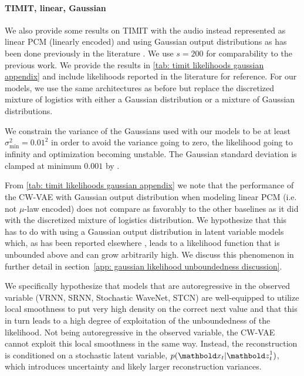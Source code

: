 {\paragraph{TIMIT, linear, Gaussian} We also provide some results on TIMIT with the audio instead represented as linear PCM (linearly encoded) and using Gaussian output distributions as has been done previously in the literature \cite{chung_recurrent_2015, fraccaro_sequential_2016, lai_stochastic_2018, aksan_stcn_2019}. We use $s=200$ for comparability to the previous work. We provide the results in \cref{tab: timit likelihoods gaussian appendix} and include likelihoods reported in the literature for reference. For our models, we use the same architectures as before but replace the discretized mixture of logistics with either a Gaussian distribution or a mixture of Gaussian distributions.

We constrain the variance of the Gaussians used with our models to be at least $\sigma^2_\text{min} = 0.01^2$ in order to avoid the variance going to zero, the likelihood going to infinity and optimization becoming unstable. The Gaussian standard deviation is clamped at minimum $0.001$ by \cite{aksan_stcn_2019}.

From \cref{tab: timit likelihoods gaussian appendix} we note that the performance of the CW-VAE with Gaussian output distribution when modeling linear PCM (i.e. not $\mu$-law encoded) does not compare as favorably to the other baselines as it did with the discretized mixture of logistics distribution. We hypothesize that this has to do with using a Gaussian output distribution in latent variable models which, as has been reported elsewhere \cite{mattei_leveraging_2018}, leads to a likelihood function that is unbounded above and can grow arbitrarily high. We discuss this phenomenon in further detail in section~\cref{app: gaussian likelihood unboundedness discussion}. 

We specifically hypothesize that models that are autoregressive in the observed variable (VRNN, SRNN, Stochastic WaveNet, STCN) are well-equipped to utilize local smoothness to put very high density on the correct next value and that this in turn leads to a high degree of exploitation of the unboundedness of the likelihood. Not being autoregressive in the observed variable, the CW-VAE cannot exploit this local smoothness in the same way. Instead, the reconstruction is conditioned on a stochastic latent variable, $p(\xb_t|\zb^1_t)$, which introduces uncertainty and likely larger reconstruction variances.


}

